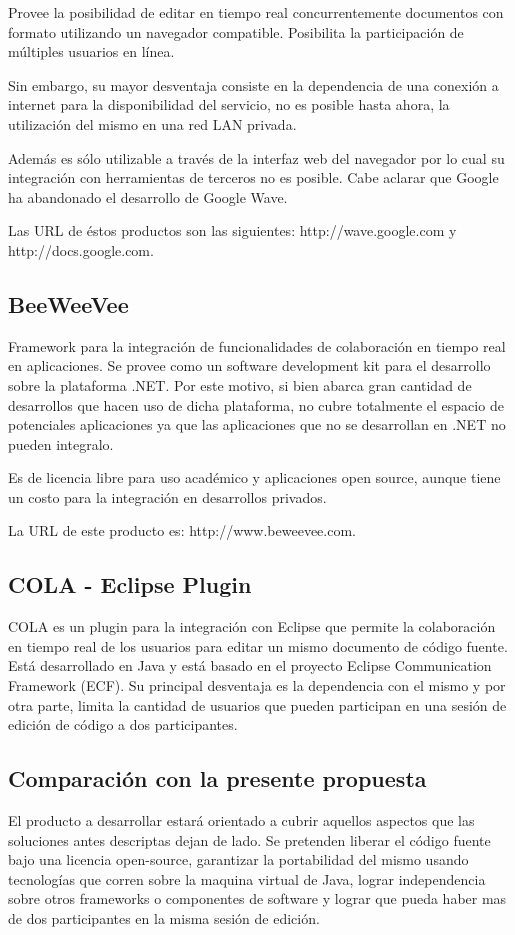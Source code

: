 \documentclass[12pt,a4paper]{article}
\begin{document}
	Provee la posibilidad de editar en tiempo real concurrentemente documentos con formato utilizando un navegador compatible. Posibilita la participación de múltiples usuarios en línea.

	Sin embargo, su mayor desventaja consiste en la dependencia de una conexión a internet para la disponibilidad del servicio, no es posible hasta ahora, la utilización del mismo en una red LAN privada.

	 Además es sólo utilizable a través de la interfaz web del navegador por lo cual su integración con herramientas de terceros no es posible. Cabe aclarar que Google ha abandonado el desarrollo de Google Wave.

	Las URL de éstos productos son las siguientes: http://wave.google.com y http://docs.google.com.

	\subsection{BeeWeeVee}

	Framework para la integración de funcionalidades de colaboración en tiempo real en aplicaciones. Se provee como un software development kit para el desarrollo sobre la plataforma .NET. Por este motivo, si bien abarca gran cantidad de desarrollos que hacen uso de dicha plataforma, no cubre totalmente el espacio de potenciales aplicaciones ya que las aplicaciones que no se desarrollan en .NET no pueden integralo.

	Es de licencia libre para uso académico y aplicaciones open source, aunque tiene un costo para la integración en desarrollos privados.

	La URL de este producto es: http://www.beweevee.com.

	\subsection{COLA - Eclipse Plugin}

	COLA es un plugin para la integración con Eclipse que permite la colaboración en tiempo real de los usuarios para editar un mismo documento de código fuente. Está desarrollado en Java y está basado en el proyecto Eclipse Communication Framework (ECF). Su principal desventaja es la dependencia con el mismo y por otra parte, limita la cantidad de usuarios que pueden participan en una sesión de edición de código a dos participantes.

	\subsection{Comparación con la presente propuesta}
El producto a desarrollar estará orientado a cubrir aquellos aspectos que las soluciones antes descriptas dejan de lado. Se pretenden liberar el código fuente bajo una licencia open-source, garantizar la portabilidad del mismo usando tecnologías que corren sobre la maquina virtual de Java, lograr independencia sobre otros frameworks o componentes de software y lograr que pueda haber mas de dos participantes en la misma sesión de edición.
\end{document}
